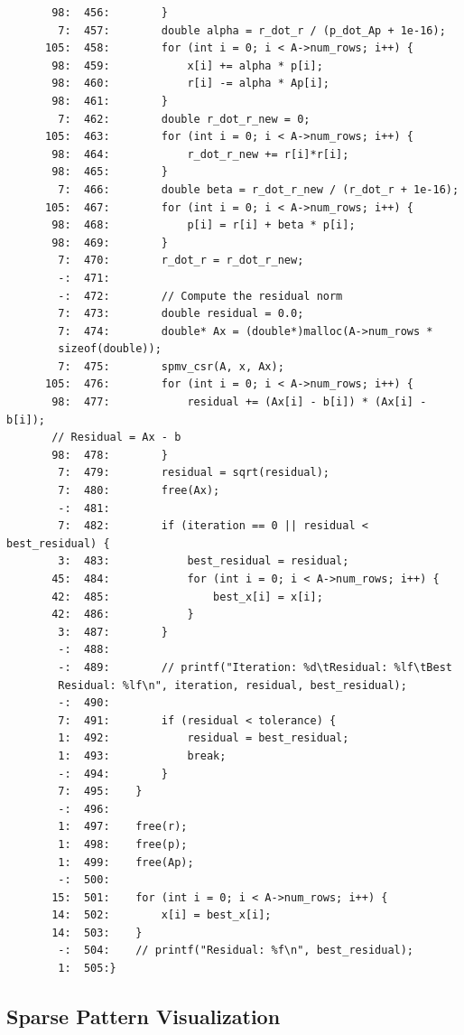 \documentclass[12pt]{article}
\begin{document}
\begin{mdframed}[style=myboxstyleTerminal1]
\begin{verbatim}
       98:  456:        }
        7:  457:        double alpha = r_dot_r / (p_dot_Ap + 1e-16);
      105:  458:        for (int i = 0; i < A->num_rows; i++) {
       98:  459:            x[i] += alpha * p[i];
       98:  460:            r[i] -= alpha * Ap[i];
       98:  461:        }
        7:  462:        double r_dot_r_new = 0;
      105:  463:        for (int i = 0; i < A->num_rows; i++) {
       98:  464:            r_dot_r_new += r[i]*r[i];
       98:  465:        }
        7:  466:        double beta = r_dot_r_new / (r_dot_r + 1e-16);
      105:  467:        for (int i = 0; i < A->num_rows; i++) {
       98:  468:            p[i] = r[i] + beta * p[i];
       98:  469:        }
        7:  470:        r_dot_r = r_dot_r_new;
        -:  471:
        -:  472:        // Compute the residual norm
        7:  473:        double residual = 0.0;
        7:  474:        double* Ax = (double*)malloc(A->num_rows * 
        sizeof(double));
        7:  475:        spmv_csr(A, x, Ax);
      105:  476:        for (int i = 0; i < A->num_rows; i++) {
       98:  477:            residual += (Ax[i] - b[i]) * (Ax[i] - b[i]); 
       // Residual = Ax - b
       98:  478:        }
        7:  479:        residual = sqrt(residual);
        7:  480:        free(Ax);
        -:  481:
        7:  482:        if (iteration == 0 || residual < best_residual) {
        3:  483:            best_residual = residual;
       45:  484:            for (int i = 0; i < A->num_rows; i++) {
       42:  485:                best_x[i] = x[i];
       42:  486:            }
        3:  487:        }
        -:  488:
        -:  489:        // printf("Iteration: %d\tResidual: %lf\tBest 
        Residual: %lf\n", iteration, residual, best_residual);
        -:  490:
        7:  491:        if (residual < tolerance) {
        1:  492:            residual = best_residual;
        1:  493:            break;
        -:  494:        } 
        7:  495:    }
        -:  496:
        1:  497:    free(r);
        1:  498:    free(p);
        1:  499:    free(Ap);
        -:  500:
       15:  501:    for (int i = 0; i < A->num_rows; i++) {
       14:  502:        x[i] = best_x[i];
       14:  503:    }
        -:  504:    // printf("Residual: %f\n", best_residual);
        1:  505:}

		\end{verbatim}
	\end{mdframed}

\subsection{Sparse Pattern Visualization}
\end{document}
